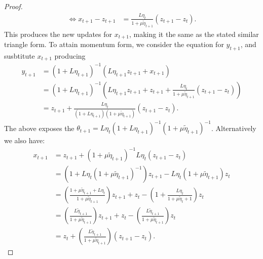 \documentclass[12pt]{article}
\begin{document}
\begin{proof}
\begin{align*}
                \iff 
                x_{t + 1} - z_{t + 1} &= 
                \frac{L\eta_t}{1 + \mu \tilde \eta_{t + 1}} 
                (z_{t + 1} - z_t). 
            \end{align*}
            This produces the new updates for $x_{t +1}$, making it the same as the stated similar triangle form. 
            To attain momentum form, we consider the equation for $y_{t + 1}$, and susbtitute $x_{t + 1}$ producing 
            \begin{align*}
                y_{t + 1} &= (1 + L\eta_{t + 1})^{-1}
                (
                    L\eta_{t + 1} z_{t + 1} + x_{t + 1}
                )
                \\
                &= 
                (1 + L\eta_{t + 1})^{-1}
                \left(
                    L\eta_{t + 1} z_{t + 1} + z_{t + 1}
                    + 
                    \frac{L\eta_t}{1 + \mu \tilde \eta_{t + 1}}
                    (z_{t + 1} - z_t)
                \right)
                \\
                &= z_{t + 1} 
                + 
                \frac{L\eta_t}{(1 + L\eta_{t + 1})(1 + \mu \tilde \eta_{t + 1})}
                (z_{t + 1} - z_t). 
            \end{align*}
            The above exposes the 
            $\theta_{t + 1} = L\eta_t(1 + L\eta_{t + 1})^{-1}(1 + \mu\tilde \eta_{t + 1})^{-1}$. 
            Alternatively we also have: 
            \begin{align*}
                x_{t + 1} &= z_{t + 1} + (1 + \mu\tilde \eta_{t + 1})^{-1}L\eta_t (z_{t + 1} - z_t)
                \\
                &=  (1 + L\eta_t(1 + \mu \tilde \eta_{t + 1})^{-1})z_{t + 1}
                - L\eta_t(1 + \mu\tilde \eta_{t + 1})z_t
                \\
                &= 
                \left(
                    \frac{1 + \mu\tilde \eta_{t + 1} + L \eta_t}{1 + \mu \tilde \eta_{t + 1}}
                \right)z_{t + 1}
                + 
                z_t - 
                \left(
                    1 + \frac{ L\eta_t}{1 + \mu \tilde \eta_t + 1}
                \right)z_t 
                \\
                &= 
                \left(
                    \frac{L\tilde \eta_{t+ 1}}{1 + \mu\tilde \eta_{t + 1}}
                \right)z_{t + 1}
                + 
                z_t 
                - 
                \left(
                    \frac{L\tilde \eta_{t + 1}}{1 + \mu \tilde \eta_{t + 1}}
                \right)z_t 
                \\
                &= z_t + 
                \left(
                    \frac{L\tilde \eta_{t + 1}}{1 + \mu \tilde \eta_{t + 1}}
                \right)
                (z_{t + 1} - z_t). 
            \end{align*}
        \end{proof}
\end{document}
